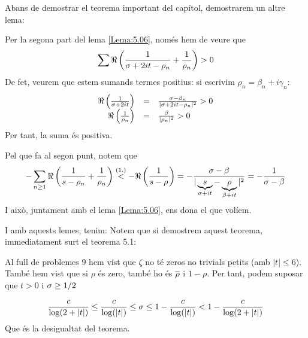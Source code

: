 Abans de demostrar el teorema important del capítol, demostrarem un altre lema:
\begin{pf}
    Per la segona part del lema \ref{Lema:5.06}, només hem de veure que 
    \[
        \sum\Re\left(\frac{1}{\sigma+2it-\rho_n}+\frac{1}{\rho_n}\right)>0
    \] 
    De fet, veurem que estem sumands termes positius: si escrivim $\rho_n=\beta_n+i\gamma_n$:
    \[
    \begin{array}{rcl}
        \Re\left(\frac{1}{\sigma+2it}\right)&=&\frac{\sigma-\beta_n}{|\sigma+2it-\rho_n|^2}>0\\
        \Re\left(\frac{1}{\rho_n}\right)&=&\frac{\beta}{|\rho_n|^2}>0

    \end{array}
    \]
    Per tant, la suma és positiva.\par
    Pel que fa al segon punt, notem que 
    \[
        -\sum_{n\geq1}\Re\left(\frac{1}{s-\rho_n}+\frac1{\rho_n}\right)\overset{(1.)}
        < -\Re\left(\frac{1}{s-\rho}\right)
        = -\frac{\sigma-\beta}{|\underbrace{s}_{\sigma+it}-\underbrace{\rho}_{\beta+it}|^2}
        = -\frac{1}{\sigma-\beta}
    \]
    I això, juntament amb el lema \ref{Lema:5.06}, ens dona el que volíem.
\end{pf}
I amb aquests lemes, tenim:
Notem que si demostrem aquest teorema, immediatament surt el teorema 5.1:
\begin{pf}
    Al full de problemes 9 hem vist que $\zeta$ no té zeros no trivials petits (amb $|t|\leq 6$). També hem vist que si $\rho$ és zero, també ho és $\overline\rho$ i $1-\rho$. Per tant, podem suposar que $t>0$ i $\sigma\geq1/2$

    \[
        \frac{c}{\log(2+|t|)}\leq\frac{c}{\log(|t|)}\leq\sigma\leq 1-\frac{c}{\log(|t|)}<1-\frac{c}{\log(2+|t|)}
    \]
    Que és la desigualtat del teorema.
\end{pf}

